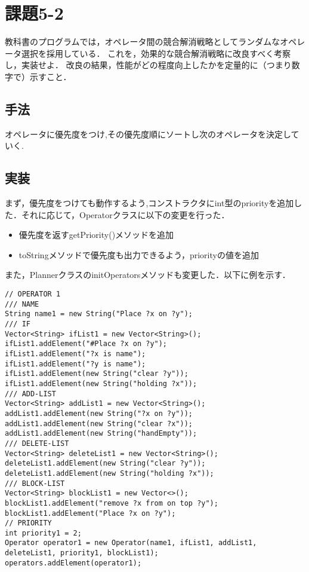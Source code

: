\documentclass[a4j]{jarticle}
\begin{document}
\section{課題5-2}
\begin{screen}
教科書のプログラムでは，オペレータ間の競合解消戦略としてランダムなオペレータ選択を採用している．
これを，効果的な競合解消戦略に改良すべく考察し，実装せよ．
改良の結果，性能がどの程度向上したかを定量的に（つまり数字で）示すこと．
\end{screen}

\subsection{手法}
オペレータに優先度をつけ,その優先度順にソートし次のオペレータを決定していく.

\subsection{実装}
まず，優先度をつけても動作するよう,コンストラクタにint型のpriorityを追加した．それに応じて，Operatorクラスに以下の変更を行った．
\begin{itemize}
\item 優先度を返すgetPriority()メソッドを追加
\item toStringメソッドで優先度も出力できるよう，priorityの値を追加
\end{itemize}
また，PlannerクラスのinitOperatorsメソッドも変更した．以下に例を示す．
\begin{lstlisting}
// OPERATOR 1
/// NAME
String name1 = new String("Place ?x on ?y");
/// IF
Vector<String> ifList1 = new Vector<String>();
ifList1.addElement("#Place ?x on ?y");
ifList1.addElement("?x is name");
ifList1.addElement("?y is name");
ifList1.addElement(new String("clear ?y"));
ifList1.addElement(new String("holding ?x"));
/// ADD-LIST
Vector<String> addList1 = new Vector<String>();
addList1.addElement(new String("?x on ?y"));
addList1.addElement(new String("clear ?x"));
addList1.addElement(new String("handEmpty"));
/// DELETE-LIST
Vector<String> deleteList1 = new Vector<String>();
deleteList1.addElement(new String("clear ?y"));
deleteList1.addElement(new String("holding ?x"));
/// BLOCK-LIST
Vector<String> blockList1 = new Vector<>();
blockList1.addElement("remove ?x from on top ?y");
blockList1.addElement("Place ?x on ?y");
// PRIORITY
int priority1 = 2;
Operator operator1 = new Operator(name1, ifList1, addList1, deleteList1, priority1, blockList1);
operators.addElement(operator1);
\end{lstlisting}
\end{document}
